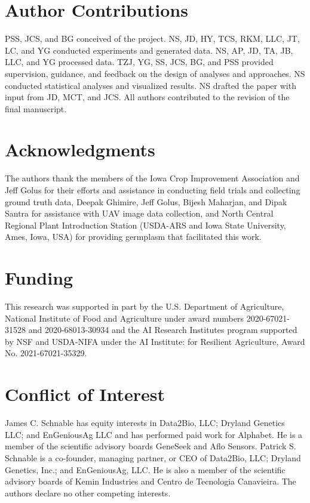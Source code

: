 \documentclass[12pt,twoside]{gsag3jnl}
\begin{document}
\section{Author Contributions}

PSS, JCS, and BG conceived of the project. NS, JD, HY, TCS, RKM, LLC, JT, LC, and YG conducted experiments and generated data. NS, AP, JD, TA, JB, LLC, and YG processed data. TZJ, YG, SS, JCS, BG, and PSS provided supervision, guidance, and feedback on the design of analyses and approaches. NS conducted statistical analyses and visualized results. NS drafted the paper with input from JD, MCT, and JCS.
All authors contributed to the revision of the final manuscript.

\section{Acknowledgments}

The authors thank the members of the Iowa Crop Improvement Association and Jeff Golus for their efforts and assistance in conducting field trials and collecting ground truth data, Deepak Ghimire, Jeff Golus, Bijesh Maharjan, and Dipak Santra for assistance with UAV image data collection, and North Central Regional Plant Introduction Station (USDA-ARS and Iowa State University, Ames, Iowa, USA) for providing germplasm that facilitated this work.

\section{Funding}

This research was supported in part by the U.S. Department of Agriculture, National Institute of Food and Agriculture under award numbers 2020-67021-31528 and 2020-68013-30934 and the AI Research Institutes program supported by NSF and USDA-NIFA under the AI Institute: for Resilient Agriculture, Award No. 2021-67021-35329.

\section{Conflict of Interest}

James C. Schnable has equity interests in Data2Bio, LLC; Dryland Genetics LLC; and EnGeniousAg LLC and has performed paid work for Alphabet. He is a member of the scientific advisory boards GeneSeek and Aflo Sensors. Patrick S. Schnable is a co-founder, managing partner, or CEO of Data2Bio, LLC; Dryland Genetics, Inc.; and EnGeniousAg, LLC. He is also a member of the scientific advisory boards of Kemin Industries and Centro de Tecnologia Canavieira. The authors declare no other competing interests.
\end{document}
